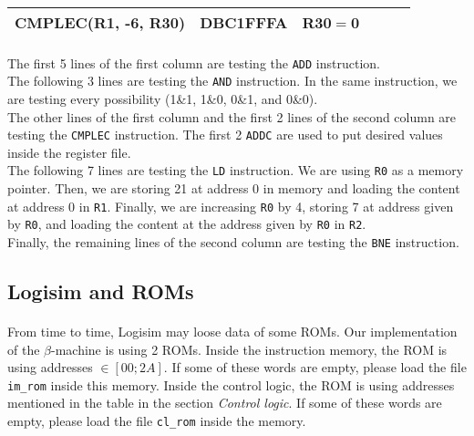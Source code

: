 \documentclass[a4paper, 10pt, oneside]{article}
\begin{document}
{\begin{tabular}{|l|l|l|l|l|l|}
CMPLEC(R1, -6, R30)                        & DBC1FFFA                                  & R30$=$0                              &                                  &                                  &                                                                                         \\ \hline
\end{tabular}
}
\paragraph{}The first 5 lines of the first column are testing the \texttt{ADD} instruction.\\
The following 3 lines are testing the \texttt{AND} instruction. In the same instruction, we are testing every possibility (1\&1, 1\&0, 0\&1, and 0\&0).\\
The other lines of the first column and the first 2 lines of the second column are testing the \texttt{CMPLEC} instruction. The first 2 \texttt{ADDC} are used to put desired values inside the register file.\\
The following 7 lines are testing the \texttt{LD} instruction. We are using \texttt{R0} as a memory pointer. Then, we are storing 21 at address 0 in memory and loading the content at address 0 in \texttt{R1}. Finally, we are increasing \texttt{R0} by 4, storing 7 at address given by \texttt{R0}, and loading the content at the address given by \texttt{R0} in \texttt{R2}.\\
Finally, the remaining lines of the second column are testing the \texttt{BNE} instruction.

\subsection*{Logisim and ROMs}
\paragraph{}From time to time, Logisim may loose data of some ROMs. Our implementation of the $\beta$-machine is using 2 ROMs. Inside the instruction memory, the ROM is using addresses $\in \left[00; 2A\right]$. If some of these words are empty, please load the file \texttt{im\_rom} inside this memory. Inside the control logic, the ROM is using addresses mentioned in the table in the section \textit{Control logic}. If some of these words are empty, please load the file \texttt{cl\_rom} inside the memory.
\end{document}
